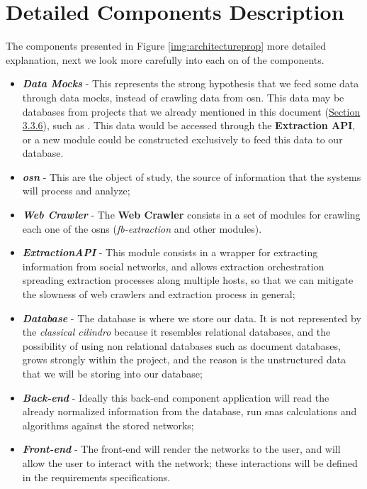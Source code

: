 \section{Detailed Components Description}
The components presented in Figure \ref{img:architectureprop} more detailed explanation, next we look more carefully into each on of the components.
\begin{itemize}
    \item \textbf{\textit{Data Mocks}} - This represents the strong hypothesis that we feed some data through data mocks, instead of crawling data from \gls{osn}. This data may be databases from projects that we already mentioned in this document  (\hyperref[sec:otherdatasources]{Section 3.3.6}), such as \cite{kunegis2013konect}. This data would be accessed through the \textbf{Extraction API}, or a new module could be constructed exclusively to feed this data to our database.
    \item \textbf{\textit{\acrfull{osn}}} - This are the object of study, the source of information that the systems will process and analyze;
    \item \textbf{\textit{Web Crawler}} - The \textbf{Web Crawler} consists in a set of modules for crawling each one of the \glspl{osn} (\textit{fb-extraction} and other modules).
    \item \textbf{\textit{ExtractionAPI}} - This module consists in a wrapper for extracting information from social networks, and allows extraction orchestration spreading extraction processes along multiple hosts, so that we can mitigate the slowness of web crawlers and extraction process in general;
    \item \textbf{\textit{Database}} - The database is where we store our data. It is not represented by the \textit{classical cilindro} because it resembles relational databases, and the possibility of using non relational databases such as document databases, grows strongly within the project, and the reason is the unstructured data that we will be storing into our database;
    \item \textbf{\textit{Back-end}} - Ideally this back-end component application will read the already normalized information from the database, run \glspl{sna} calculations and algorithms against the stored networks;
    \item \textbf{\textit{Front-end}} - The front-end will render the networks to the user, and will allow the user to interact with the network; these interactions will be defined in the requirements specifications.
\end{itemize}
